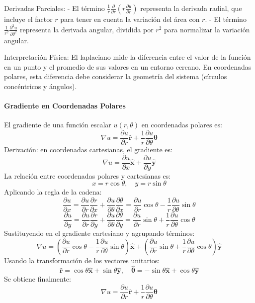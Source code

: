 \documentclass[11pt]{book}
\newcounter{cuent}
\theoremstyle{definicion}
\theoremstyle{teorema}
\theoremstyle{ejemplo}
\begin{document}
\noindent
Derivadas Parciales:
   - El término \(\frac{1}{r} \frac{\partial}{\partial r}\left(r \frac{\partial u}{\partial r}\right)\) representa la derivada radial, que incluye el factor \( r \) para tener en cuenta la variación del área con \( r \).
   - El término \(\frac{1}{r^2} \frac{\partial^2 u}{\partial \theta^2}\) representa la derivada angular, dividida por \( r^2 \) para normalizar la variación angular.

\medskip

\noindent Interpretación Física:
   El laplaciano mide la diferencia entre el valor de la función en un punto y el promedio de sus valores en un entorno cercano. En coordenadas polares, esta diferencia debe considerar la geometría del sistema (círculos concéntricos y ángulos).

\paragraph{Gradiente en Coordenadas Polares}
%

El gradiente de una función escalar \( u(r, \theta) \) en coordenadas polares es:
%
\[
\nabla u = \frac{\partial u}{\partial r} \hat{\mathbf{r}} + \frac{1}{r} \frac{\partial u}{\partial \theta} \hat{\boldsymbol{\theta}}
\]
%
Derivación:
en coordenadas cartesianas, el gradiente es:
  \[
  \nabla u = \frac{\partial u}{\partial x} \hat{\mathbf{x}} + \frac{\partial u}{\partial y} \hat{\mathbf{y}}
  \]
La relación entre coordenadas polares y cartesianas es:
  \[
  x = r \cos \theta, \quad y = r \sin \theta
  \]
Aplicando la regla de la cadena:
  \[
  \frac{\partial u}{\partial x} = \frac{\partial u}{\partial r} \frac{\partial r}{\partial x} + \frac{\partial u}{\partial \theta} \frac{\partial \theta}{\partial x} = \frac{\partial u}{\partial r} \cos \theta - \frac{1}{r} \frac{\partial u}{\partial \theta} \sin \theta
  \]
  \[
  \frac{\partial u}{\partial y} = \frac{\partial u}{\partial r} \frac{\partial r}{\partial y} + \frac{\partial u}{\partial \theta} \frac{\partial \theta}{\partial y} = \frac{\partial u}{\partial r} \sin \theta + \frac{1}{r} \frac{\partial u}{\partial \theta} \cos \theta
  \]
Sustituyendo en el gradiente cartesiano y agrupando términos:
  \[
  \nabla u = \left( \frac{\partial u}{\partial r} \cos \theta - \frac{1}{r} \frac{\partial u}{\partial \theta} \sin \theta \right) \hat{\mathbf{x}} + \left( \frac{\partial u}{\partial r} \sin \theta + \frac{1}{r} \frac{\partial u}{\partial \theta} \cos \theta \right) \hat{\mathbf{y}}
  \]
Usando la transformación de los vectores unitarios:
  \[
  \hat{\mathbf{r}} = \cos \theta \hat{\mathbf{x}} + \sin \theta \hat{\mathbf{y}}, \quad \hat{\boldsymbol{\theta}} = -\sin \theta \hat{\mathbf{x}} + \cos \theta \hat{\mathbf{y}}
  \]
Se obtiene finalmente:
  \[
  \nabla u = \frac{\partial u}{\partial r} \hat{\mathbf{r}} + \frac{1}{r} \frac{\partial u}{\partial \theta} \hat{\boldsymbol{\theta}}
  \]
\end{document}
